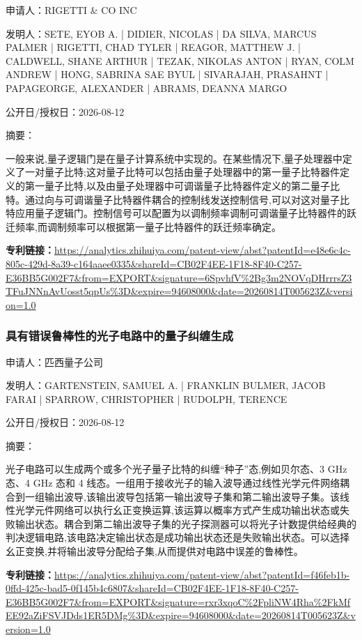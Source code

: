 \documentclass[12pt,a4paper]{ctexart}
\begin{document}
申请人：RIGETTI \& CO INC

发明人：SETE, EYOB A. | DIDIER, NICOLAS | DA SILVA, MARCUS PALMER | RIGETTI, CHAD TYLER | REAGOR, MATTHEW J. | CALDWELL, SHANE ARTHUR | TEZAK, NIKOLAS ANTON | RYAN, COLM ANDREW | HONG, SABRINA SAE BYUL | SIVARAJAH, PRASAHNT | PAPAGEORGE, ALEXANDER | ABRAMS, DEANNA MARGO

公开日/授权日：2026-08-12

摘要：

一般来说,量子逻辑门是在量子计算系统中实现的。在某些情况下,量子处理器中定义了一对量子比特;这对量子比特可以包括由量子处理器中的第一量子比特器件定义的第一量子比特,以及由量子处理器中可调谐量子比特器件定义的第二量子比特。通过向与可调谐量子比特器件耦合的控制线发送控制信号,可以对这对量子比特应用量子逻辑门。控制信号可以配置为以调制频率调制可调谐量子比特器件的跃迁频率,而调制频率可以根据第一量子比特器件的跃迁频率确定。

\noindent\textbf{专利链接：}\url{https://analytics.zhihuiya.com/patent-view/abst?patentId=e48e6c4c-805c-429d-8a39-c164aaee0335&shareId=CB02F4EE-1F18-8F40-C257-E36BB5G002F7&from=EXPORT&signature=6SpvhfV%2Bg3m2NOVqDHrrrsZ3TFuJNNnAvUosst5qpUs%3D&expire=94608000&date=20260814T005623Z&version=1.0}

\subsubsection{ 具有错误鲁棒性的光子电路中的量子纠缠生成 }

申请人：匹西量子公司

发明人：GARTENSTEIN, SAMUEL A. | FRANKLIN BULMER, JACOB FARAI | SPARROW, CHRISTOPHER | RUDOLPH, TERENCE

公开日/授权日：2026-08-12

摘要：

光子电路可以生成两个或多个光子量子比特的纠缠“种子”态,例如贝尔态、3 GHz 态、4 GHz 态和 4 线态。一组用于接收光子的输入波导通过线性光学元件网络耦合到一组输出波导,该输出波导包括第一输出波导子集和第二输出波导子集。该线性光学元件网络可以执行幺正变换运算,该运算以概率方式产生成功输出状态或失败输出状态。耦合到第二输出波导子集的光子探测器可以将光子计数提供给经典的判决逻辑电路,该电路决定输出状态是成功输出状态还是失败输出状态。可以选择幺正变换,并将输出波导分配给子集,从而提供对电路中误差的鲁棒性。

\noindent\textbf{专利链接：}\url{https://analytics.zhihuiya.com/patent-view/abst?patentId=f46feb1b-0ffd-425c-bad5-0f145b4c6807&shareId=CB02F4EE-1F18-8F40-C257-E36BB5G002F7&from=EXPORT&signature=rxr3xqoC%2FpliNW4Rha%2FkMfEE92aZiFSVJDds1ER5DMg%3D&expire=94608000&date=20260814T005623Z&version=1.0}
\end{document}
